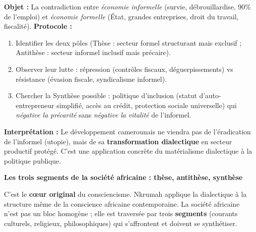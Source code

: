 \documentclass[11pt]{article}
\begin{document}
\begin{experience}
\textbf{Objet :} La contradiction entre \emph{économie informelle} (survie, débrouillardise, 90\% de l'emploi) et \emph{économie formelle} (État, grandes entreprises, droit du travail, fiscalité).
\textbf{Protocole :}
\begin{enumerate}
    \item Identifier les deux pôles (Thèse : secteur formel structurant mais exclusif ; Antithèse : secteur informel inclusif mais précaire).
    \item Observer leur lutte : répression (contrôles fiscaux, déguerpissements) vs résistance (évasion fiscale, syndicalisme informel).
    \item Chercher la Synthèse possible : politique d'inclusion (statut d'auto-entrepreneur simplifié, accès au crédit, protection sociale universelle) qui \emph{négative la précarité} sans \emph{négative la vitalité} de l'informel.
\end{enumerate}
\textbf{Interprétation :} Le développement camerounais ne viendra pas de l'éradication de l'informel (utopie), mais de sa \textbf{transformation dialectique} en secteur productif protégé. C'est une application concrète du matérialisme dialectique à la politique publique.
\end{experience}

\textbf{Les trois segments de la société africaine : thèse, antithèse, synthèse}\par

C'est le \textbf{cœur original} du consciencisme. Nkrumah applique la dialectique à la structure même de la conscience africaine contemporaine. La société africaine n'est pas un bloc homogène ; elle est traversée par trois \textbf{segments} (courants culturels, religieux, philosophiques) qui s'affrontent et doivent se synthétiser.
\end{document}
